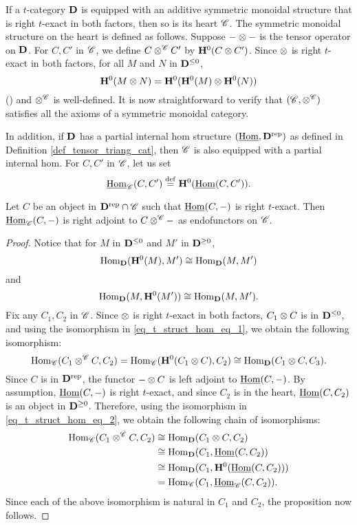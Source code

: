 If a $t$-category $\mathbf{D}$ is equipped with an additive symmetric 
monoidal structure that is right $t$-exact in both factors, then 
so is its heart $\mathscr{C}$. The symmetric monoidal structure on
the heart is defined as follows. Suppose $- \otimes -$ is the 
tensor operator on $\mathbf{D}$. For $C, C'$ in $\mathscr{C}$, we define $C 
\otimes^{\mathscr{C}} C'$ by $\mathbf{H}^0(C \otimes C')$. 
Since $\otimes$ is right $t$-exact in both factors, for all $M$ 
and $N$ in $\mathbf{D}^{\leq 0}$,
\[
\mathbf{H}^0(M \otimes N) = \mathbf{H}^0(\mathbf{H}^0(M) \otimes \mathbf{H}^0(N))
\]
(\cite[5.10]{DegModHom}) and $\otimes^{\mathscr{C}}$ is well-defined.
It is now straightforward to verify that $(\mathscr{C}, 
\otimes^{\mathscr{C}})$ satisfies all the axioms of a symmetric 
monoidal category. 

In addition, if $\mathbf{D}$ has a partial internal hom structure
$(\underline{\mathrm{Hom}}, \mathbf{D}^{\mathrm{rep}})$ as defined in Definition 
\ref{def_tensor_triang_cat}, then $\mathscr{C}$ is also equipped
with a partial internal hom. For $C, C'$ in $\mathscr{C}$, let us
set
\[
\underline{\mathrm{Hom}}_{\mathscr{C}}(C, C') \stackrel{\mathrm{def}}{=} \mathbf{H}^0(\underline{\mathrm{Hom}}(C, C')).
\]
\begin{prop}\label{prop_ihomC_is_partial_ihom}
Let $C$ be an object in $\mathbf{D}^{\mathrm{rep}} \cap \mathscr{C}$ such that 
$\underline{\mathrm{Hom}}(C, -)$ is right $t$-exact. Then $\underline{\mathrm{Hom}}_{\mathscr{C}}(C, -)$ is 
right adjoint to $C \otimes^{\mathscr{C}} -$ as endofunctors on 
$\mathscr{C}$.
\end{prop}
\begin{proof}
Notice that for $M$ in $\mathbf{D}^{\leq 0}$ and $M'$ in 
$\mathbf{D}^{\geq 0}$,
\begin{equation}\label{eq_t_struct_hom_eq_1}
\mathrm{Hom}_{\mathbf{D}}(\mathbf{H}^0(M), M') \cong \mathrm{Hom}_{\mathbf{D}}(M, M')
\end{equation}
and
\begin{equation}\label{eq_t_struct_hom_eq_2}
\mathrm{Hom}_{\mathbf{D}}(M, \mathbf{H}^0(M')) \cong \mathrm{Hom}_{\mathbf{D}}(M, M').
\end{equation}
Fix any $C_1, C_2$ in $\mathscr{C}$. Since $\otimes$ is right 
$t$-exact in both factors, $C_1 \otimes C$ is in $\mathbf{D}^{\leq 0}$, 
and using the isomorphism in \eqref{eq_t_struct_hom_eq_1}, we 
obtain the following isomorphism:
\[
\mathrm{Hom}_{\mathscr{C}}(C_1 \otimes^{\mathscr{C}} C, C_2) = 
\mathrm{Hom}_{\mathscr{C}}(\mathbf{H}^0(C_1 \otimes C), C_2) 
\cong \mathrm{Hom}_{\mathbf{D}}(C_1 \otimes C, C_3).
\]
Since $C$ is in $\mathbf{D}^{\mathrm{rep}}$, the functor $- \otimes C$ is 
left adjoint to $\underline{\mathrm{Hom}}(C, -)$. By assumption, $\underline{\mathrm{Hom}}(C, -)$ is 
right $t$-exact, and since $C_2$ is in the heart, $\underline{\mathrm{Hom}}(C, C_2)$ 
is an object in $\mathbf{D}^{\geq 0}$. Therefore, using the isomorphism 
in \eqref{eq_t_struct_hom_eq_2}, we obtain the following chain of
isomorphisms:
\begin{align*}
\mathrm{Hom}_{\mathscr{C}}(C_1 \otimes^{\mathscr{C}} C, C_2)
&\cong \mathrm{Hom}_{\mathbf{D}}(C_1 \otimes C, C_2) \\
&\cong \mathrm{Hom}_{\mathbf{D}}(C_1, \underline{\mathrm{Hom}}(C, C_2)) \\
&\cong \mathrm{Hom}_{\mathbf{D}}(C_1, \mathbf{H}^0(\underline{\mathrm{Hom}}(C, C_2))) \\
&= \mathrm{Hom}_{\mathscr{C}}(C_1, \underline{\mathrm{Hom}}_{\mathscr{C}}(C, C_2)).
\end{align*}
Since each of the above isomorphism is natural in $C_1$ and $C_2$, 
the proposition now follows.
\end{proof}

